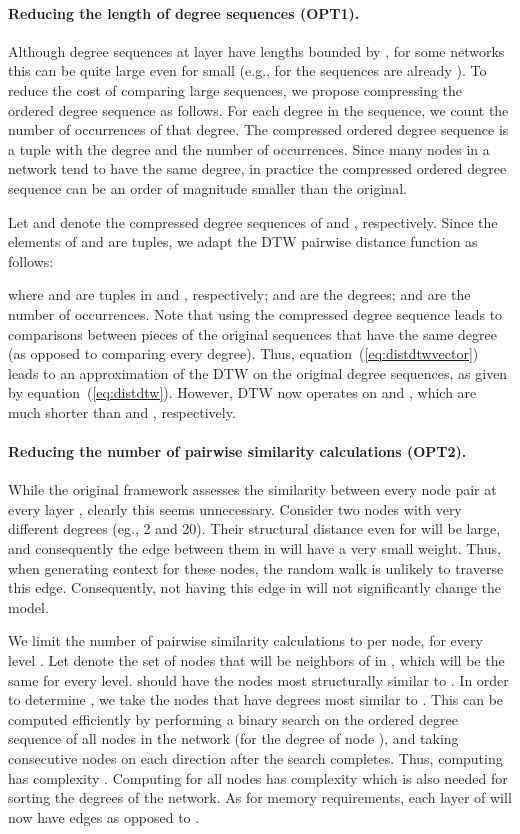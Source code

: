\documentclass[sigconf]{acmart}
\begin{document}
\paragraph{Reducing the length of degree sequences (OPT1).} Although degree sequences at layer  have lengths bounded by , for some networks this can be quite large even for small  (e.g., for  the sequences are already ). To reduce the cost of comparing large sequences, we propose compressing the ordered degree sequence as follows. For each degree in the sequence, we count the number of occurrences of that degree. The compressed ordered degree sequence is a tuple with the degree and the number of occurrences. Since many nodes in a network tend to have the same degree, in practice the compressed ordered degree sequence can be an order of magnitude smaller than the original. 


Let  and  denote the compressed degree sequences of  and , respectively. Since the elements of  and  are tuples, we adapt the DTW pairwise distance function as follows:

where  and  are tuples in  and , respectively;  and  are the degrees;  and  are the number of occurrences. 
Note that using the compressed degree sequence leads to comparisons between pieces of the original sequences that have the same degree (as opposed to comparing every degree). Thus, equation~(\ref{eq:distdtwvector}) leads to an approximation of the DTW on the original degree sequences, as given by equation~(\ref{eq:distdtw}). However, DTW now operates on  and , which are much shorter than  and , respectively. 



\paragraph{Reducing the number of pairwise similarity calculations (OPT2).}
While the original framework assesses the similarity between every node pair at every layer , clearly this seems unnecessary. Consider two nodes with very different degrees (eg., 2 and 20). Their structural distance even for  will be large, and consequently the edge between them in  will have a very small weight. Thus, when generating context for these nodes, the random walk is unlikely to traverse this edge. Consequently, not having this edge in  will not significantly change the model. 

We limit the number of pairwise similarity calculations to  per node, for every level . Let  denote the set of nodes that will be neighbors of  in , which will be the same for every level.  should have the nodes most structurally similar to . In order to determine , we take the nodes that have degrees most similar to . This can be computed efficiently by performing a binary search on the ordered degree sequence of all nodes in the network (for the degree of node ), and taking  consecutive nodes on each direction after the search completes. Thus, computing  has complexity . Computing  for all nodes has complexity  which is also needed for sorting the degrees of the network. As for memory requirements, each layer of  will now have  edges as opposed to . 
\end{document}

